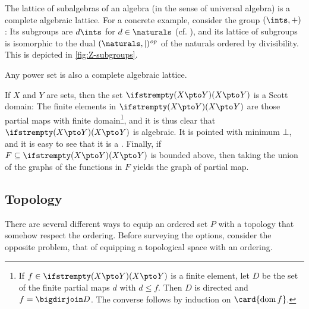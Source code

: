 \newcommand{\subalg}[1]{\operatorname{Sub}#1}

\begin{examplesbreak}
    \begin{enumexample}
        \item The lattice of subalgebras of an algebra (in the sense of universal algebra) is a complete algebraic lattice. For a concrete example, consider the group $(\ints,+)$: Its subgroups are $d\ints$ for $d \in \naturals$ (cf. \cite[Proposition~6.9]{aluffi-algebra-0}), and its lattice of subgroups is isomorphic to the dual $\dualord{(\naturals,\mid)}$ of the naturals ordered by divisibility. This is depicted in \cref{fig:Z-subgroups}. %

        \item Any power set is also a complete algebraic lattice.

        \item\label{enum:pmaps-domain} If $X$ and $Y$ are sets, then the set $\pmaps{X}{Y}$ is a Scott domain: The finite elements in $\pmaps{X}{Y}$ are those partial maps with finite domain\footnote{If $f \in \pmaps{X}{Y}$ is a finite element, let $D$ be the set of the finite partial maps $d$ with $d \leq f$. Then $D$ is directed and $f = \bigdirjoin D$. The converse follows by induction on $\card{\dom{f}}$.}, and it is thus clear that $\pmaps{X}{Y}$ is algebraic. It is pointed with minimum $\bot$, and it is easy to see that it is a \dCPO. Finally, if $F \subseteq \pmaps{X}{Y}$ is bounded above, then taking the union of the graphs of the functions in $F$ yields the graph of partial map.
    \end{enumexample}
\end{examplesbreak}


\subsection{Topology}

\newcommand{\specorder}[1]{\Omega#1}

There are several different ways to equip an ordered set $P$ with a topology that somehow respect the ordering. Before surveying the options, consider the opposite problem, that of equipping a topological space with an ordering.

